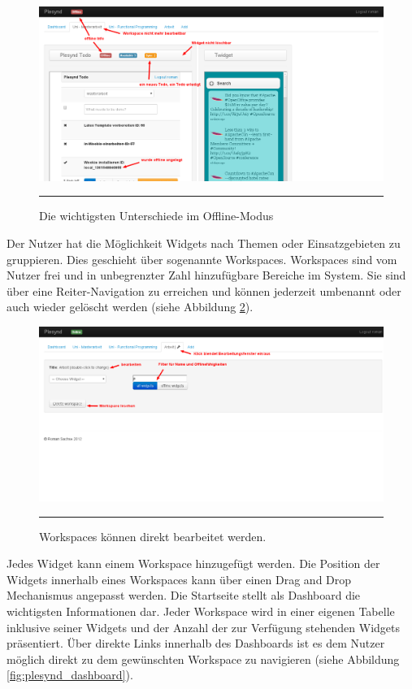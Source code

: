 \begin{figure}
  \centering
  \includegraphics[width=\textwidth,height=\textheight,keepaspectratio]{./Figures/plesynd_workspace_offline.png}
    \rule{35em}{0.5pt}
  \caption[Plesynd User-Interface: Workspace Offline]{Die wichtigsten Unterschiede im Offline-Modus}
  \label{fig:plesynd_workspace_offline}
\end{figure}
Der Nutzer hat die Möglichkeit Widgets nach Themen oder Einsatzgebieten zu gruppieren. Dies geschieht über sogenannte Workspaces. Workspaces sind vom Nutzer frei und in unbegrenzter Zahl hinzufügbare Bereiche im System. Sie sind über eine Reiter-Navigation zu erreichen und können jederzeit umbenannt oder auch wieder gelöscht werden (siehe Abbildung \ref{fig:plesynd_workspace_edit}). 
\begin{figure}
  \centering
  \includegraphics[width=\textwidth,height=\textheight,keepaspectratio]{./Figures/plesynd_workspace_edit.png}
    \rule{35em}{0.5pt}
  \caption[Plesynd User-Interface: Bearbeiten von Workspaces]{Workspaces können direkt bearbeitet werden.}
  \label{fig:plesynd_workspace_edit}
\end{figure}
Jedes Widget kann einem Workspace hinzugefügt werden. Die Position der Widgets innerhalb eines Workspaces kann über einen Drag and Drop Mechanismus angepasst werden. Die Startseite stellt als Dashboard die wichtigsten Informationen dar. Jeder Workspace wird in einer eigenen Tabelle inklusive seiner Widgets und der Anzahl der zur Verfügung stehenden Widgets präsentiert. Über direkte Links innerhalb des Dashboards ist es dem Nutzer möglich direkt zu dem gewünschten Workspace zu navigieren (siehe Abbildung \ref{fig:plesynd_dashboard}).
